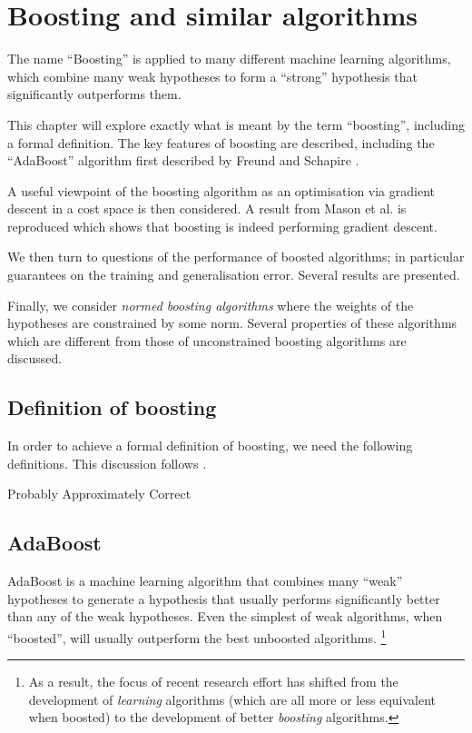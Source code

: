



\chapter{Boosting and similar algorithms}

The name ``Boosting'' is applied to many different machine learning
algorithms, which combine many weak hypotheses to form a ``strong''
hypothesis that significantly outperforms them.

This chapter will explore exactly what is meant by the term
``boosting'', including a formal definition.  The key features of
boosting are described, including the ``AdaBoost'' algorithm first
described by Freund and Schapire \cite{Freund96}.

A useful viewpoint of the boosting algorithm as an optimisation via
gradient descent in a cost space is then considered.  A result from
Mason et al. \cite{Mason99} is reproduced which shows that boosting is
indeed performing gradient descent.

We then turn to questions of the performance of boosted algorithms; in
particular guarantees on the training and generalisation error.
Several results are presented.

Finally, we consider \emph{normed boosting algorithms} where the
weights of the hypotheses are constrained by some norm.  Several
properties of these algorithms which are different from those of
unconstrained boosting algorithms are discussed.






\section{Definition of boosting}

In order to achieve a formal definition of boosting, we need the
following definitions.  This discussion follows \cite{Duffy99}.

Probably Approximately Correct



\section{AdaBoost}

AdaBoost is a machine learning algorithm
that combines many ``weak'' hypotheses to generate a hypothesis 
that usually performs significantly better than any of the weak
hypotheses.  Even the simplest of weak algorithms, when
``boosted'', will usually outperform the best unboosted algorithms.
\footnote{As a result, the focus of recent research effort has shifted from the
development of \emph{learning} algorithms (which are all more
or less equivalent when boosted) to the development of better \emph{boosting}
algorithms.}

